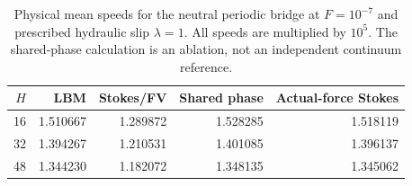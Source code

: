 \begin{table}[htbp]\centering\small
\caption{Physical mean speeds for the neutral periodic bridge at $F=10^{-7}$ and prescribed hydraulic slip $\lambda=1$. All speeds are multiplied by $10^5$. The shared-phase calculation is an ablation, not an independent continuum reference.}\label{tab:kineticspeeds}
\begin{tabular}{rrrrr}\toprule
$H$ & LBM & Stokes/FV & Shared phase & Actual-force Stokes \\ \midrule
16 & 1.510667 & 1.289872 & 1.528285 & 1.518119 \\
32 & 1.394267 & 1.210531 & 1.401085 & 1.396137 \\
48 & 1.344230 & 1.182072 & 1.348135 & 1.345062 \\
\bottomrule\end{tabular}\end{table}
